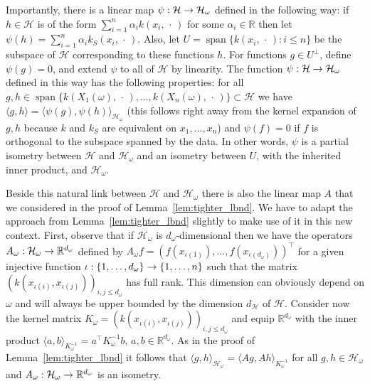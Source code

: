 \documentclass[10pt]{amsart}
\theoremstyle{definition}\newtheorem{defi}[theo]{Definition}\newtheorem{rema}[theo]{Remark}\newtheorem{exam}[theo]{Example}\newtheorem{exem}[theo]{Example}\newtheorem{nota}[theo]{Notation}
\theoremstyle{remark}
\DeclareMathOperator{\spn}{span}
\newcommand{\R}{\mathbb{R}}
\newcommand{\cH}{\mathcal{H}}
\renewcommand*{\to}{\mathchoice{\longrightarrow}{\rightarrow}{\rightarrow}{\rightarrow}}
\begin{document}
Importantly, there is a linear map $\psi:\cH \to \cH_\omega$ defined in the following way: if $h \in \cH$ is of the form $\sum_{i=1}^n \alpha_i k(x_i,\,\cdot\,)$ for some $\alpha_i \in \R$ then let $\psi(h) = \sum_{i=1}^n \alpha_i k_S(x_i,\,\cdot\,)$. Also, let $U = \spn \{k(x_i,\,\cdot\,) : i \leq n\}$ be the subspace of $\cH$ corresponding to these functions $h$. For functions $g \in U^\perp$, define $\psi(g) = 0$, and extend $\psi$ to all of $\cH$ by linearity. The function $\psi: \cH \to \cH_\omega$ defined in this way has the following properties: for all $g,h \in \spn \{k(X_1(\omega),\,\cdot\,), \dots, k(X_n(\omega),\,\cdot\,)\} \subset \cH$ we have $\langle g,h \rangle = \langle \psi(g), \psi(h) \rangle_{\cH_\omega}$ (this follows right away from the kernel expansion of $g,h$ because $k$ and $k_S$ are equivalent on $x_1,\dots,x_n$) and $\psi(f) = 0$ if $f$ is orthogonal to the subspace spanned by the data. In other words, $\psi$ is a partial isometry between $\cH$ and $\cH_\omega$ and an isometry between $U$, with the inherited inner product, and $\cH_\omega$.


Beside this natural link between $\cH$ and $\cH_\omega$ there is also the linear map $A$ that we considered in the proof of Lemma~\ref{lem:tighter_lbnd}. We have to adapt the approach from Lemma~\ref{lem:tighter_lbnd} slightly to make use of it in this new context. First, observe that if $\cH_\omega$ is $d_\omega$-dimensional then we have the operators $A_\omega: \cH_\omega \to \R^{d_\omega}$ defined by $A_\omega f = (f(x_{\iota(1)}), \dots, f(x_{\iota(d_\omega)}))^\top$ for a given injective function $\iota:\{1,\dots, d_\omega\} \to \{1, \dots, n\}$ such that the matrix $(k(x_{\iota(i)},x_{\iota(j)}))_{i,j\leq d_\omega}$ has full rank. This dimension can obviously depend on $\omega$ and will always be upper bounded by the dimension $d_\cH$ of $\cH$. Consider now the kernel matrix $K_\omega = (k(x_{\iota(i)},x_{\iota(j)}))_{i,j \leq d_\omega}$ and equip $\R^{d_\omega}$ with the inner product $\langle a, b \rangle_{K_\omega^{-1}} =a^\top K_\omega^{-1} b$, $a,b \in \R^{d_\omega}$. As in the proof of Lemma~\ref{lem:tighter_lbnd} it follows that $\langle g,h \rangle_{\cH_\omega} = \langle A g, Ah \rangle_{K^{-1}_\omega} $ for all $g,h \in \cH_\omega$ and $A_\omega : \cH_\omega \to \R^{d_\omega}$ is an isometry.
\end{document}
